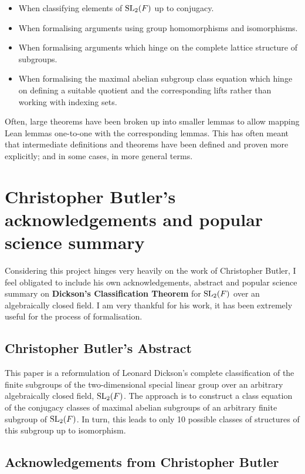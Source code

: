 \begin{itemize}
    \begin{itemize}
        \item When classifying elements of $\operatorname{SL}_2(F)$ up to conjugacy.
        \item When formalising arguments using group homomorphisms and isomorphisms.
        \item When formalising arguments which hinge on the complete lattice structure of subgroups.
        \item When formalising the maximal abelian subgroup class equation which hinge on defining
        a suitable quotient and the corresponding lifts rather than working with indexing sets.
    \end{itemize}
    
    Often, large theorems have been broken up into smaller lemmas to allow mapping Lean lemmas one-to-one with the corresponding lemmas. 
    This has often meant that intermediate definitions and theorems have been defined and proven more explicitly; and in some cases, 
    in more general terms.
\end{itemize}


\section{Christopher Butler's acknowledgements and popular science summary}

Considering this project hinges very heavily on the work of Christopher Butler, I feel obligated to include his own acknowledgements,
 abstract and popular science summary on \textbf{Dickson's Classification Theorem} for $\operatorname{SL}_2(F)$ over an algebraically closed field.
I am very thankful for his work, it has been extremely useful for the process of formalisation.

\subsection{Christopher Butler's Abstract }

This paper is a reformulation of Leonard Dickson's complete classification of the finite subgroups of the two-dimensional special linear group over an arbitrary algebraically closed field, $\operatorname{SL}_2(F)$. The approach is to construct a class equation of the conjugacy classes of maximal abelian subgroups of an arbitrary finite subgroup of $\operatorname{SL}_2(F)$. In turn, this leads to only 10 possible classes of structures of this subgroup up to isomorphism.

\subsection{Acknowledgements from Christopher Butler}

